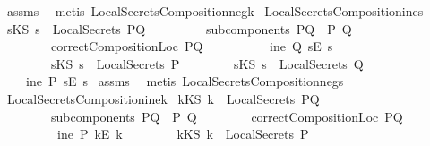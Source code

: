 \begin{isabellebody}
\ assms\ \isamarkupfalse%
\ {\isacharparenleft}metis\ LocalSecretsComposition{\isacharunderscore}neg{}{\isacharunderscore}k{\isacharparenright}%
\endisatagproof
{\isafoldproof}%
%
\isadelimproof
\isanewline
%
\endisadelimproof
\isanewline
{}\isamarkupfalse%
\ LocalSecretsComposition{\isacharunderscore}ine{}{\isacharunderscore}s{\isacharcolon}\isanewline
{}\ {\isachardoublequoteopen}sKS\ s\ {\isasymin}\ LocalSecrets\ PQ{\isachardoublequoteclose}\ \isanewline
\ \ \ \ \ \ \ \ {\isachardoublequoteopen}subcomponents\ PQ\ {\isacharequal}\ {\isacharbraceleft}P{\isacharcomma}\ Q{\isacharbraceright}{\isachardoublequoteclose}\isanewline
\ \ \ \ \ \ \ \ {\isachardoublequoteopen}correctCompositionLoc\ PQ{\isachardoublequoteclose}\ \isanewline
\ \ \ \ \ \ \ \ {\isachardoublequoteopen}{\isasymnot}\ ine\ Q\ {\isacharparenleft}sE\ s{\isacharparenright}{\isachardoublequoteclose}\isanewline
\ \ \ \ \ \ \ \ {\isachardoublequoteopen}sKS\ s\ {\isasymnotin}\ LocalSecrets\ P{\isachardoublequoteclose}\isanewline
\ \ \ \ \ \ \ \ {\isachardoublequoteopen}sKS\ s\ {\isasymnotin}\ LocalSecrets\ Q{\isachardoublequoteclose}\isanewline
{}\ \ \ \ {\isachardoublequoteopen}ine\ P\ {\isacharparenleft}sE\ s{\isacharparenright}{\isachardoublequoteclose}\isanewline
%
\isadelimproof
%
\endisadelimproof
%
\isatagproof
{}\isamarkupfalse%
\ assms\ \isamarkupfalse%
\ {\isacharparenleft}metis\ LocalSecretsComposition{\isacharunderscore}neg{}{\isacharunderscore}s{\isacharparenright}%
\endisatagproof
{\isafoldproof}%
%
\isadelimproof
\isanewline
%
\endisadelimproof
\isanewline
{}\isamarkupfalse%
\ LocalSecretsComposition{\isacharunderscore}ine{}{\isacharunderscore}k{\isacharcolon}\isanewline
{}\ {\isachardoublequoteopen}kKS\ k\ {\isasymin}\ LocalSecrets\ PQ{\isachardoublequoteclose}\isanewline
\ \ \ \ \ \ \ \ {\isachardoublequoteopen}subcomponents\ PQ\ {\isacharequal}\ {\isacharbraceleft}P{\isacharcomma}\ Q{\isacharbraceright}{\isachardoublequoteclose}\isanewline
\ \ \ \ \ \ \ \ {\isachardoublequoteopen}correctCompositionLoc\ PQ{\isachardoublequoteclose}\isanewline
\ \ \ \ \ \ \ \ {\isachardoublequoteopen}{\isasymnot}\ ine\ P\ {\isacharparenleft}kE\ k{\isacharparenright}{\isachardoublequoteclose}\isanewline
\ \ \ \ \ \ \ \ {\isachardoublequoteopen}kKS\ k\ {\isasymnotin}\ LocalSecrets\ P{\isachardoublequoteclose}\isanewline

\end{isabellebody}
